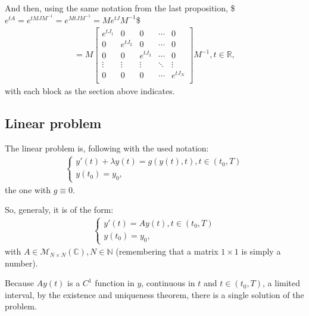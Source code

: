 \documentclass[letterpaper,10pt,english]{jupyterBook}
\begin{document}
\sphinxAtStartPar
And then, using the same notation from the last proposition,
\$\(
e^{tA} = e^{tMJM^{-1}} = e^{MtJM^{-1}} = Me^{tJ}M^{-1} 
\)\$
\begin{equation*}
\begin{split}
    = M \left[ { \begin{array}{ccccc}
        e^{tJ_1} & 0 & 0 & \dotsm & 0\\
        0 & e^{tJ_2} & 0 & \dotsm & 0\\
        0 & 0 & e^{tJ_3} & \dotsm & 0\\
        \vdots & \vdots & \vdots & \ddots & \vdots\\
        0 & 0 & 0 & \dotsm & e^{tJ_{N}}\\
    \end{array} } \right] M^{-1}, t \in \mathbb{R},
\end{split}
\end{equation*}
\sphinxAtStartPar
with each block as the section above indicates.


\subsection{Linear problem}
\label{\detokenize{cap3:linear-problem}}
\sphinxAtStartPar
The linear problem is, following with the used notation:
\begin{equation*}
\begin{split}
\begin{cases}
    y'(t) + \lambda y(t) = g(y(t), t), t \in (t_0, T) \\
    y(t_0) = y_0 
    \text{,}
\end{cases}
\end{split}
\end{equation*}
\sphinxAtStartPar
the one with \(g \equiv 0.\)

\sphinxAtStartPar
So, generaly, it is of the form:
\begin{equation*}
\begin{split}
\begin{cases}
    y'(t) = A y(t), t \in (t_0, T) \\
    y(t_0) = y_0 
    \text{,}
\end{cases}
\end{split}
\end{equation*}
\sphinxAtStartPar
with \(A \in \mathscr{M}_{N \times N}(\mathbb{C}), N \in \mathbb{N}\)  (remembering that a matrix \(1 \times 1\) is simply a number).

\sphinxAtStartPar
Because \(A y(t)\) is a \(C^1\) function in \(y\), continuous in \(t\) and \(t \in (t_0, T)\), a limited interval, by the existence and uniqueness theorem, there is a single solution of the problem.
\end{document}
